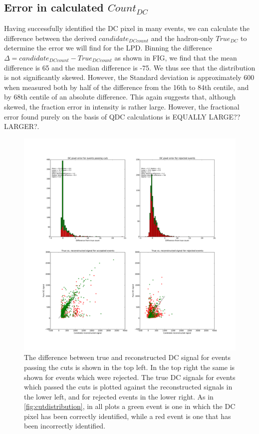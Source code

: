 \documentclass[]{article}
\begin{document}
\subsection{Error in calculated $Count_{DC}$}
Having successfully identified the DC pixel in many events, we can calculate the difference between the derived $candidate_{DC count}$ and the hadron-only $True_{DC}$ to determine the error we will find for the LPD. Binning the difference $\Delta = candidate_{DC count} - True_{DC count}$ as shown in FIG, we find that the mean difference is 65 and the median difference is -75. We thus see that the distribution is not significantly skewed. However, the Standard deviation is approximately 600 when measured both by half of the difference from the 16th to 84th centile, and by 68th centile of an absolute difference. This again suggests that, although skewed, the fraction error in intensity is rather large. However, the fractional error found purely on the basis of QDC calculations is EQUALLY LARGE??LARGER?.

\begin{figure}
\begin{center}
\includegraphics[width=\textwidth]{DCcounterrorhess1}
\caption{The difference between true and reconstructed DC signal for events passing the cuts is shown in the top left. In the top right the same is shown for events which were rejected. The true DC signals for events which passed the cuts is plotted against the reconstructed signals in the lower left, and for rejected events in the lower right. As in \ref{fig:cutdistribution}, in all plots a green event is one in which the DC pixel has been correctly identified, while a red event is one that has been incorrectly identified.}
\label{fig:dcdiff}
\end{center}
\end{figure}



\end{document}
